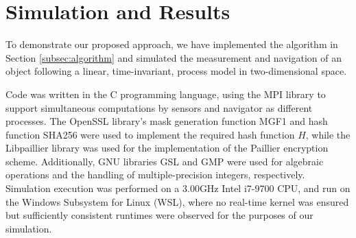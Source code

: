 \documentclass[twocolumn]{autart}
\begin{document}
\section{Simulation and Results} \label{sec:sim_and_results}
To demonstrate our proposed approach, we have implemented the algorithm in Section \ref{subsec:algorithm} and simulated the measurement and navigation of an object following a linear, time-invariant, process model in two-dimensional space. 

Code was written in the C programming language, using the MPI library \cite{OpenMPI2020} to support simultaneous computations by sensors and navigator as different processes. The OpenSSL library's \cite{OpenSSL2020} mask generation function MGF1 and hash function SHA256 were used to implement the required hash function $H$, while the Libpaillier library \cite{Libpaillier2010} was used for the implementation of the Paillier encryption scheme. Additionally, GNU libraries GSL \cite{GSLGNUScientific2019} and GMP \cite{GMPGNUMultiple2020} were used for algebraic operations and the handling of multiple-precision integers, respectively. Simulation execution was performed on a 3.00GHz Intel i7-9700 CPU, and run on the Windows Subsystem for Linux (WSL), where no real-time kernel was ensured but sufficiently consistent runtimes were observed for the purposes of our simulation.
\end{document}
